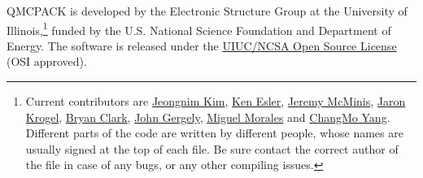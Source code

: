QMCPACK is developed by the Electronic Structure Group at the University of Illinois,\footnote{Current contributors are \href{mailto:jnkim@ncsa.illinois.edu}{Jeongnim Kim}, \href{mailto:esler@illinois.edu}{Ken Esler}, \href{mailto:mcminis2@illinois.edu}{Jeremy McMinis}, \href{mailto:jkrogel2@illinois.edu}{Jaron Krogel}, \href{mailto:bclark@princeton.edu}{Bryan Clark}, \href{mailto:johngergely@gmail.com}{John Gergely}, \href{mailto:Miguel.Morales@rice.edu}{Miguel Morales} and \href{mailto:dcyang2@illinois.edu}{ChangMo Yang}.  Different parts of the code are written by different people, whose names are usually signed at the top of each file.  Be sure contact the correct author of the file in case of any bugs, or any other compiling issues.} funded by the U.S. National Science Foundation and Department of Energy. The software is released under the \href{http://www.opensource.org/licenses/UoI-NCSA.php}{UIUC/NCSA Open Source License} (OSI approved). 
